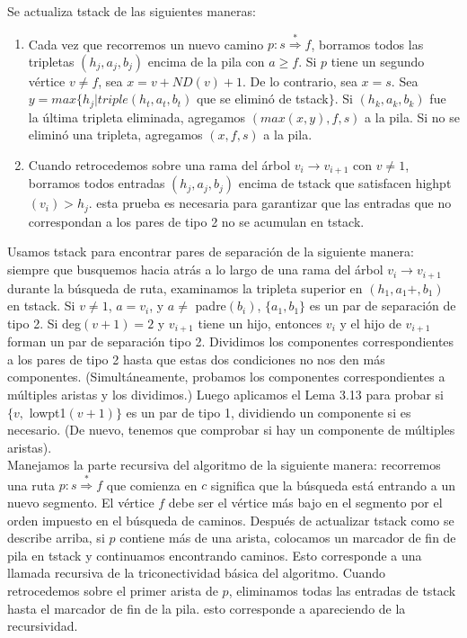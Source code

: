 Se actualiza tstack de las siguientes maneras:\\

\begin{enumerate}
\item Cada vez que recorremos un nuevo camino $p: s \overset{\ast}{\Rightarrow} f$, borramos todos las tripletas $(h_{j}, a_{j}, b_{j})$ encima de la pila con $a \ge f$. Si $p$ tiene un segundo vértice $v \neq f$, sea $x = v + ND\left(v\right) + 1$. De lo contrario, sea $x = s$. Sea $y = max\{h_{j} | triple(h_{t}, a_{t}, b_{t})$ que se eliminó de tstack$\}$. Si $(h_{k}, a_{k}, b_{k})$ fue la última tripleta eliminada, agregamos $\left(max\left(x, y\right), f, s\right)$ a la pila. Si no se eliminó una tripleta, agregamos $\left(x, f, s\right)$ a la pila.
\item Cuando retrocedemos sobre una rama del árbol $v_{i} \rightarrow v_{i+1}$ con $v \neq 1$, borramos todos entradas $(h_{j}, a_{j}, b_{j})$ encima de tstack que satisfacen highpt$\left(v_{i}\right) > h_{j}$. esta prueba es necesaria para garantizar que las entradas que no correspondan a los pares de tipo 2 no se acumulan en tstack.
\end{enumerate}

Usamos tstack para encontrar pares de separación de la siguiente manera: siempre que busquemos hacia atrás a lo largo de una rama del árbol $v_{i} \rightarrow v_{i+1}$ durante la búsqueda de ruta, examinamos la tripleta superior en $\left(h_{1}, a_{1}+, b_{1}\right)$ en tstack. Si $v \neq 1$, $a = v_{i}$, y $a \neq$ padre$(b_{i})$, $\{a_{1},b_{1}\}$ es un par de separación de tipo 2. Si deg$\left(v + 1\right) = 2$ y $v_{i+1}$ tiene un hijo, entonces $v_{i}$ y el hijo de $v_{i+1}$ forman un par de separación tipo 2. Dividimos los componentes correspondientes a los pares de tipo 2 hasta que estas dos condiciones no nos den más componentes. (Simultáneamente, probamos los componentes correspondientes a múltiples aristas y los dividimos.) Luego aplicamos el Lema 3.13 para probar si $\{v,$ lowpt1$\left(v+ 1\right)\}$ es un par de tipo 1, dividiendo un componente si es necesario. (De nuevo, tenemos que comprobar si hay un componente de múltiples aristas).\\

Manejamos la parte recursiva del algoritmo de la siguiente manera: recorremos una ruta $p: s \overset{\ast}{\Rightarrow} f$ que comienza en $c$ significa que la búsqueda está entrando a un nuevo segmento. El vértice $f$ debe ser el vértice más bajo en el segmento por el orden impuesto en el búsqueda de caminos. Después de actualizar tstack como se describe arriba, si $p$ contiene más de una arista, colocamos un marcador de fin de pila en tstack y continuamos encontrando caminos. Esto corresponde a una llamada recursiva de la triconectividad básica del algoritmo. Cuando retrocedemos sobre el primer arista de $p$, eliminamos todas las entradas de tstack hasta el marcador de fin de la pila. esto corresponde a apareciendo de la recursividad.

